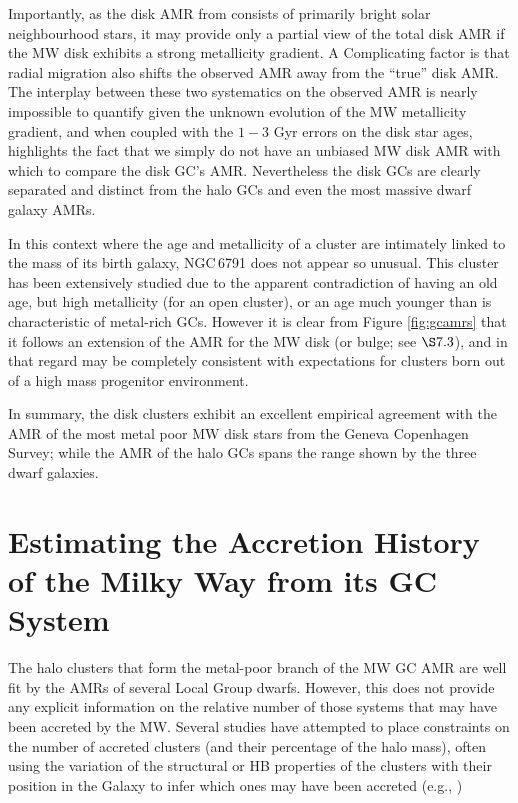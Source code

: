 \documentclass[useAMS,usenatbib]{mn2e}
\begin{document}
Importantly, as the disk AMR from 
\cite{Casagrande11} consists of primarily bright solar neighbourhood stars,
it may provide only a partial view of the total disk AMR
if the MW disk exhibits a strong metallicity gradient.  A Complicating factor is that radial
migration also shifts the observed AMR away from the ``true'' disk AMR.  
The interplay between these two
systematics on the observed AMR is nearly impossible to quantify given the
unknown evolution of the MW metallicity gradient, and when coupled with the $1-3$ Gyr
errors on the disk star ages, highlights the fact that we simply do not have an
unbiased MW disk AMR with which to compare the disk GC's AMR.  Nevertheless
the disk GCs are clearly separated and distinct from the halo GCs and even 
the most massive dwarf galaxy AMRs.

In this context where the age and metallicity of a cluster are intimately
linked to the mass of its birth galaxy, NGC$\,$6791 does not appear so unusual.
This cluster has been extensively studied due to the apparent contradiction
of having an old age, but high metallicity (for an open cluster), 
or an age much younger than is characteristic of metal-rich GCs.  However it is clear from
Figure \ref{fig:gcamrs} that it follows an extension of the AMR for the MW disk 
(or bulge; see $\S 7.3$), and in that regard may be completely consistent
with expectations for clusters born out of a high mass progenitor environment. 

In summary, the disk clusters exhibit an excellent empirical
agreement with the AMR of the
most metal poor MW disk stars from the 
Geneva Copenhagen Survey; while the AMR of the
halo GCs spans the range shown by the three dwarf galaxies.

\section{Estimating the Accretion History of the Milky Way from its GC System}
The halo clusters that form the metal-poor branch of the MW GC AMR are
well fit by the AMRs of several Local Group dwarfs.  However, this does not
provide any explicit information on the relative number of those systems that
may have been accreted by the MW.  Several studies have attempted to place
constraints on the number of accreted clusters (and their percentage of the
halo mass), often using the variation of the structural or HB properties of the
clusters with their position in the Galaxy to infer which ones may have been
accreted (e.g., \citealt{Mackey05,Forbes10})
\end{document}
